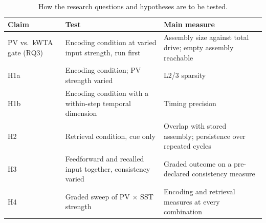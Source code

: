\begin{table}[htbp]
\centering
\small
\setlength{\tabcolsep}{4pt}
\renewcommand{\arraystretch}{1.15}
\begin{tabular}{>{\raggedright\arraybackslash}p{2.6cm}>{\raggedright\arraybackslash}p{4.9cm}>{\raggedright\arraybackslash}p{4.2cm}}
\hline
\textbf{Claim} & \textbf{Test} & \textbf{Main measure} \\
\hline
PV vs.\ kWTA gate (RQ3) & Encoding condition at varied input strength, run first & Assembly size against total drive; empty assembly reachable \\
H1a & Encoding condition; PV strength varied & L2/3 sparsity \\
H1b & Encoding condition with a within-step temporal dimension & Timing precision \\
H2 & Retrieval condition, cue only & Overlap with stored assembly; persistence over repeated cycles \\
H3 & Feedforward and recalled input together, consistency varied & Graded outcome on a pre-declared consistency measure \\
H4 & Graded sweep of PV $\times$ SST strength & Encoding and retrieval measures at every combination \\
\hline
\end{tabular}
\caption{How the research questions and hypotheses are to be tested.}
\label{tab:aims-tests}
\end{table}
